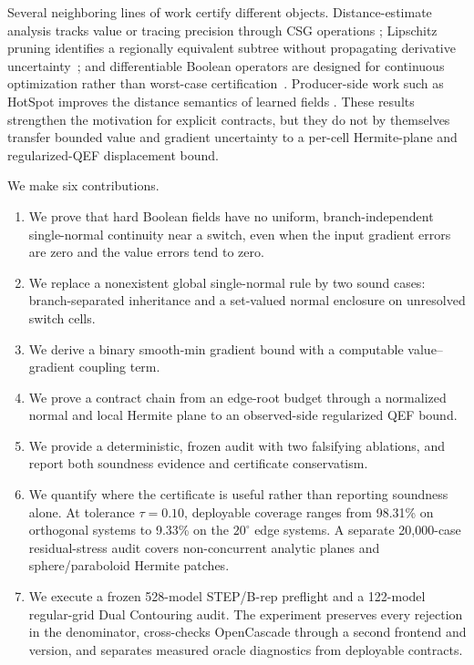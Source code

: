 \documentclass[11pt]{article}
\theoremstyle{definition}
\begin{document}
Several neighboring lines of work certify different objects.  Distance-estimate
analysis tracks value or tracing precision through CSG operations
\cite{balint2023sdfe}; Lipschitz pruning identifies a regionally equivalent
subtree without propagating derivative uncertainty~\cite{barbier2025pruning};
and differentiable Boolean operators are designed for continuous optimization
rather than worst-case certification~\cite{liu2024fuzzy}.  Producer-side work
such as HotSpot improves the distance semantics of learned fields
\cite{wang2025hotspot}.  These results strengthen the motivation for explicit
contracts, but they do not by themselves transfer bounded value and gradient
uncertainty to a per-cell Hermite-plane and regularized-QEF displacement bound.

We make six contributions.

\begin{enumerate}[leftmargin=*,itemsep=2pt]
\item We prove that hard Boolean fields have no uniform,
branch-independent single-normal continuity near a switch, even when the input
gradient errors are zero and the value errors tend to zero.
\item We replace a nonexistent global single-normal rule by two sound cases:
branch-separated inheritance and a set-valued normal enclosure on unresolved
switch cells.
\item We derive a binary smooth-min gradient bound with a computable
value--gradient coupling term.
\item We prove a contract chain from an edge-root budget through a normalized
normal and local Hermite plane to an observed-side regularized QEF bound.
\item We provide a deterministic, frozen audit with two falsifying ablations,
and report both soundness evidence and certificate conservatism.
\item We quantify where the certificate is useful rather than reporting
soundness alone.  At tolerance \(\tau=0.10\), deployable coverage ranges from
98.31\% on orthogonal systems to 9.33\% on the \(20^\circ\) edge systems.  A
separate 20,000-case residual-stress audit covers non-concurrent analytic
planes and sphere/paraboloid Hermite patches.
\item We execute a frozen 528-model STEP/B-rep preflight and a 122-model
regular-grid Dual Contouring audit.  The experiment preserves every rejection
in the denominator, cross-checks OpenCascade through a second frontend and
version, and separates measured oracle diagnostics from deployable contracts.
\end{enumerate}
\end{document}
